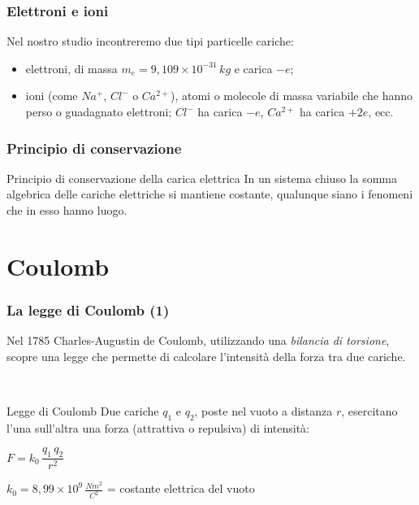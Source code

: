 \documentclass[]{beamer}
\theoremstyle{plain}
\begin{document}
\begin{frame}
\frametitle{Elettroni e ioni}
Nel nostro studio incontreremo due tipi particelle cariche:
\begin{itemize}
  \item \alert<1>{elettroni}, di massa $ m_e = 9, 109 \times 10^{-31}  \, kg $ e carica $ -e $;\pause
  \item \alert<2>{ioni} (come $ Na^{+} $, $ Cl^{-} $ o $ Ca^{2+} $), atomi o molecole di massa variabile che hanno perso o guadagnato elettroni; $ Cl^{-} $ ha carica $ -e $, $ Ca^{2+} $ ha carica $ +2e $, ecc.
\end{itemize}
\end{frame}



\begin{frame}
\frametitle{Principio di conservazione}
\begin{block}{Principio di conservazione della carica elettrica}
In un sistema chiuso la somma algebrica delle cariche elettriche si mantiene
costante, qualunque siano i fenomeni che in esso hanno luogo.
\end{block}
\end{frame}

\section{Coulomb}


\begin{frame}
\frametitle{La legge di Coulomb (1)}
Nel 1785 Charles-Augustin de Coulomb, utilizzando una \emph{bilancia di torsione}, scopre una legge che permette di calcolare l'intensità della forza  tra due cariche.\pause

~

\begin{block}{Legge di Coulomb}
Due cariche $ q_1 $ e $ q_2 $, poste nel vuoto a distanza $ r $, esercitano l'una sull'altra una forza (attrattiva o repulsiva) di intensità:
\begin{center}
\colorbox{marroncino!30}{$ F = k_0 \,  \dfrac{q_1 \, q_2}{r^2} $}
\end{center}
$ k_0 = 8,99 \times 10^9 \, \frac{Nm^2}{C^2}$ =  costante elettrica del vuoto
\end{block}


\begin{center}
\href{video/Coulomb.mp4}{}
\end{center}
\end{frame}
\end{document}
